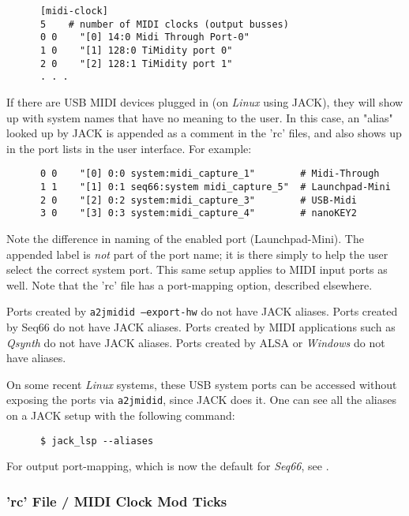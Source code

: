    \begin{verbatim}
      [midi-clock]
      5    # number of MIDI clocks (output busses)
      0 0    "[0] 14:0 Midi Through Port-0"
      1 0    "[1] 128:0 TiMidity port 0"
      2 0    "[2] 128:1 TiMidity port 1"
      . . .
   \end{verbatim}

   If there are USB MIDI devices plugged in (on \textsl{Linux} using JACK),
   they will show up with system names that have no meaning to the user.
   In this case, an "alias" looked up by JACK is appended as a comment in the
   'rc' files, and also shows up in the port lists in the user interface.
   For example:

   \begin{verbatim}
      0 0    "[0] 0:0 system:midi_capture_1"        # Midi-Through
      1 1    "[1] 0:1 seq66:system midi_capture_5"  # Launchpad-Mini
      2 0    "[2] 0:2 system:midi_capture_3"        # USB-Midi
      3 0    "[3] 0:3 system:midi_capture_4"        # nanoKEY2
   \end{verbatim}

   Note the difference in naming of the enabled port (Launchpad-Mini).
   The appended label is \textsl{not} part of the port name;
   it is there simply to help the user select the correct system port.
   This same setup applies to MIDI input ports as well.
   Note that the 'rc' file has a port-mapping option, described elsewhere.

   Ports created by \texttt{a2jmidid --export-hw} do not have JACK aliases.
   Ports created by Seq66 do not have JACK aliases.  Ports created by MIDI
   applications such as \textsl{Qsynth} do not have JACK aliases. Ports
   created by ALSA or \textsl{Windows} do not have aliases.

   On some recent \textsl{Linux} systems,
   these USB system ports can be accessed without
   exposing the ports via \texttt{a2jmidid}, since JACK does it.
   One can see all the aliases on a JACK setup with the following
   command:

   \begin{verbatim}
      $ jack_lsp --aliases
   \end{verbatim}

   For output port-mapping, which is now the default for \textsl{Seq66},
   see .

\subsubsection{'rc' File / MIDI Clock Mod Ticks}
\label{subsubsec:configuration_rc_midi_cmt}

